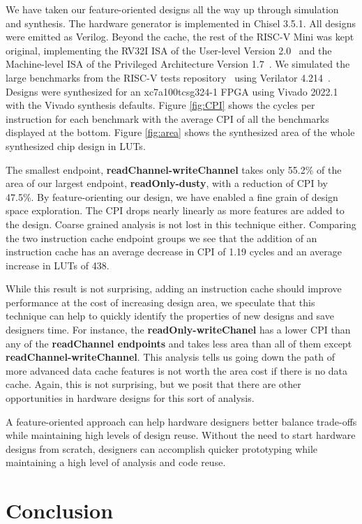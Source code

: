 \documentclass[conference]{IEEEtran}
\begin{document}
We have taken our feature-oriented designs all the way up through simulation and synthesis. The hardware generator is implemented in Chisel 3.5.1. All designs were emitted as Verilog. Beyond the cache, the rest of the RISC-V Mini was kept original, implementing the RV32I ISA of the User-level Version 2.0~\cite{} and the Machine-level ISA of the Privileged Architecture Version 1.7~\cite{}. We simulated the large benchmarks from the RISC-V tests repository~\cite{RvTest} using Verilator 4.214~\cite{}. Designs were synthesized for an xc7a100tcsg324-1 FPGA using Vivado 2022.1 with the Vivado synthesis defaults. Figure \ref{fig:CPI} shows the cycles per instruction for each benchmark with the average CPI of all the benchmarks displayed at the bottom. Figure \ref{fig:area} shows the synthesized area of the whole synthesized chip design in LUTs. 

The smallest endpoint, \textbf{readChannel-writeChannel} takes only 55.2\% of the area of our largest endpoint, \textbf{readOnly-dusty}, with a reduction of CPI by 47.5\%. By feature-orienting our design, we have enabled a fine grain of design space exploration. The CPI drops nearly linearly as more features are added to the design. Coarse grained analysis is not lost in this technique either. Comparing the two instruction cache endpoint groups we see that the addition of an instruction cache has an average decrease in CPI of 1.19 cycles and an average increase in LUTs of 438. 

While this result is not surprising, adding an instruction cache should improve performance at the cost of increasing design area, we speculate that this technique can help to quickly identify the properties of new designs and save designers time. For instance, the \textbf{readOnly-writeChanel} has a lower CPI than any of the \textbf{readChannel endpoints} and takes less area than all of them except \textbf{readChannel-writeChannel}. This analysis tells us going down the path of more advanced data cache features is not worth the area cost if there is no data cache. Again, this is not surprising, but we posit that there are other opportunities in hardware designs for this sort of analysis.

A feature-oriented approach can help hardware designers better balance trade-offs while maintaining high levels of design reuse. Without the need to start hardware designs from scratch, designers can accomplish quicker prototyping while maintaining a high level of analysis and code reuse.

\section{Conclusion}





\end{document}
